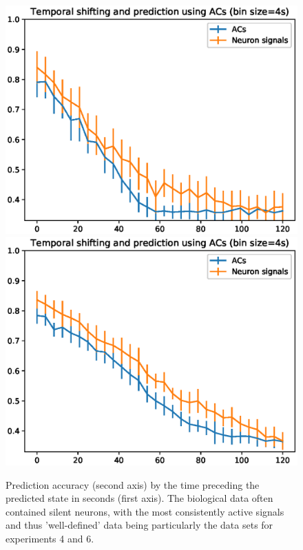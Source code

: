 \documentclass[mphil,deptreport,ianc]{infthesis} %
\begin{document}
\begin{figure}
    \centering
    \vspace{-0.1in}
    \includegraphics[width=0.7\columnwidth]{figures/LDA/lda_temporal_shifting_and_prediction_bins_4_lda_acs_temporal_windows_4_exp_6.eps}
    \vspace{-0.1in}
    \includegraphics[width=0.7\columnwidth]{figures/LDA/lda_temporal_shifting_and_prediction_bins_4_lda_acs_temporal_windows_4_exp_4.eps}
    \vspace{-0.1in}
    \caption{Prediction accuracy (second axis) by the time preceding the predicted state in seconds (first axis). The biological data often contained silent neurons, with the most consistently active signals and thus 'well-defined' data being particularly the data sets for experiments 4 and 6.}
    \label{fig:lda_classification}
\end{figure}
\end{document}

